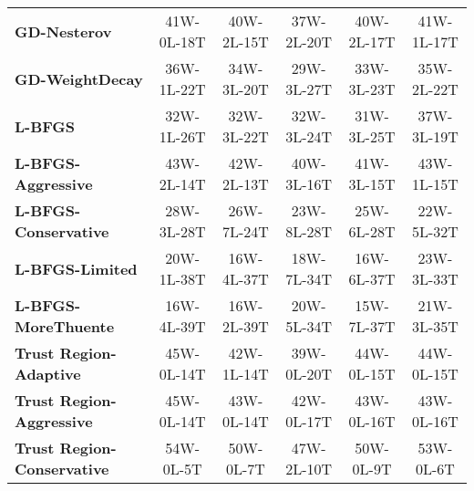 \begin{table}[htbp]
{\begin{tabular}{lccccc}
\textbf{GD-Nesterov} & \textcolor{green!70!black}{41W-0L-18T} & \textcolor{green!70!black}{40W-2L-15T} & \textcolor{green!70!black}{37W-2L-20T} & \textcolor{green!70!black}{40W-2L-17T} & \textcolor{green!70!black}{41W-1L-17T} \\
\textbf{GD-WeightDecay} & \textcolor{green!70!black}{36W-1L-22T} & \textcolor{green!70!black}{34W-3L-20T} & \textcolor{green!70!black}{29W-3L-27T} & \textcolor{green!70!black}{33W-3L-23T} & \textcolor{green!70!black}{35W-2L-22T} \\
\textbf{L-BFGS} & \textcolor{green!70!black}{32W-1L-26T} & \textcolor{green!70!black}{32W-3L-22T} & \textcolor{green!70!black}{32W-3L-24T} & \textcolor{green!70!black}{31W-3L-25T} & \textcolor{green!70!black}{37W-3L-19T} \\
\textbf{L-BFGS-Aggressive} & \textcolor{green!70!black}{43W-2L-14T} & \textcolor{green!70!black}{42W-2L-13T} & \textcolor{green!70!black}{40W-3L-16T} & \textcolor{green!70!black}{41W-3L-15T} & \textcolor{green!70!black}{43W-1L-15T} \\
\textbf{L-BFGS-Conservative} & \textcolor{green!70!black}{28W-3L-28T} & \textcolor{green!70!black}{26W-7L-24T} & \textcolor{green!70!black}{23W-8L-28T} & \textcolor{green!70!black}{25W-6L-28T} & \textcolor{green!70!black}{22W-5L-32T} \\
\textbf{L-BFGS-Limited} & \textcolor{green!70!black}{20W-1L-38T} & \textcolor{green!70!black}{16W-4L-37T} & \textcolor{green!70!black}{18W-7L-34T} & \textcolor{green!70!black}{16W-6L-37T} & \textcolor{green!70!black}{23W-3L-33T} \\
\textbf{L-BFGS-MoreThuente} & \textcolor{green!70!black}{16W-4L-39T} & \textcolor{green!70!black}{16W-2L-39T} & \textcolor{green!70!black}{20W-5L-34T} & \textcolor{green!70!black}{15W-7L-37T} & \textcolor{green!70!black}{21W-3L-35T} \\
\textbf{Trust Region-Adaptive} & \textcolor{green!70!black}{45W-0L-14T} & \textcolor{green!70!black}{42W-1L-14T} & \textcolor{green!70!black}{39W-0L-20T} & \textcolor{green!70!black}{44W-0L-15T} & \textcolor{green!70!black}{44W-0L-15T} \\
\textbf{Trust Region-Aggressive} & \textcolor{green!70!black}{45W-0L-14T} & \textcolor{green!70!black}{43W-0L-14T} & \textcolor{green!70!black}{42W-0L-17T} & \textcolor{green!70!black}{43W-0L-16T} & \textcolor{green!70!black}{43W-0L-16T} \\
\textbf{Trust Region-Conservative} & \textcolor{green!70!black}{54W-0L-5T} & \textcolor{green!70!black}{50W-0L-7T} & \textcolor{green!70!black}{47W-2L-10T} & \textcolor{green!70!black}{50W-0L-9T} & \textcolor{green!70!black}{53W-0L-6T} \\

\end{tabular}}
\end{table}

